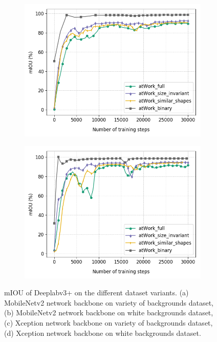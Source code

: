 \begin{figure}
\begin{subfigure}{.45\textwidth}
			\includegraphics[width=1\linewidth]{images/xcep_4vars}
			\caption{}
			\label{Fig:xcepvarsa}
		\end{subfigure}
		\begin{subfigure}{.45\textwidth}
			\centering
			\includegraphics[width=1\linewidth]{images/xcep_4vars_white}
			\caption{}
			\label{Fig:xcepvarsb}
		\end{subfigure}
		\caption{mIOU of Deeplabv3+ on the different dataset variants. (a) MobileNetv2 network backbone on variety of backgrounds dataset, (b) MobileNetv2 network backbone on white backgrounds dataset, (c) Xception network backbone on variety of backgrounds dataset, (d) Xception network backbone on white backgrounds dataset.}
		\label{Fig:vars}
	\end{figure}
	
